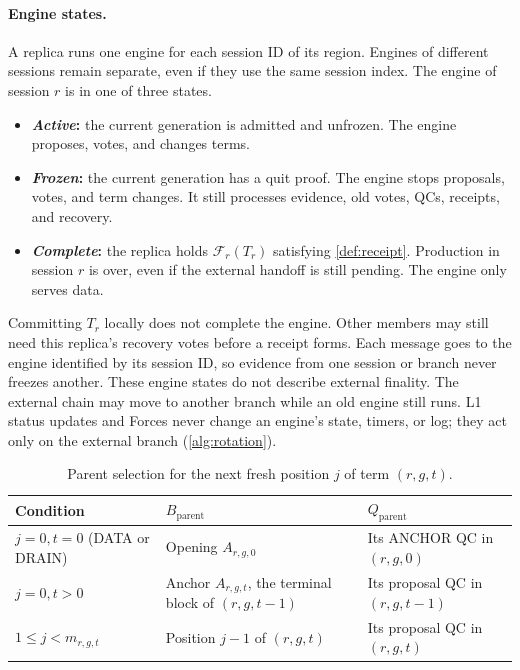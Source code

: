 \documentclass[11pt,a4paper]{article}
\newcommand{\FC}{\mathcal F}
\newcommand{\defterm}[1]{\textcolor{rrBlue}{\textit{#1}}}
\begin{document}
\paragraph{Engine states.}
A replica runs one engine for each session ID of its region.
Engines of different sessions remain separate, even if they use the
same session index. The engine of
session $r$ is in one of three states.
\begin{itemize}
\item \textbf{\defterm{Active}:} the current generation is admitted and unfrozen.
The engine proposes, votes, and changes terms.
\item \textbf{\defterm{Frozen}:} the current generation has a quit proof. The
engine stops proposals, votes, and term changes. It still processes
evidence, old votes, QCs, receipts, and recovery.
\item \textbf{\defterm{Complete}:} the replica holds $\FC_r(T_r)$ satisfying
\cref{def:receipt}.
Production in session $r$ is over, even if the external handoff is still
pending. The engine only serves data.
\end{itemize}
Committing $T_r$ locally does not complete the engine. Other members may
still need this replica's recovery votes before a receipt forms. Each
message goes to the engine identified by its session ID, so
evidence from one session or branch never freezes another. These engine
states do not describe external finality. The external chain may move
to another branch while an old engine still runs. L1 status
updates and Forces never change an engine's state, timers, or log; they
act only on the external branch (\cref{alg:rotation}).

\begin{table}[htbp]\centering\small
\caption{Parent selection for the next fresh position $j$ of term $(r,g,t)$.}
\label{tab:parent}
\begin{tabularx}{\linewidth}{@{}l Y Y@{}}
\toprule
Condition & $B_{\mathrm{parent}}$ & $Q_{\mathrm{parent}}$\\
\midrule
$j=0,t=0$ (DATA or DRAIN) & Opening $A_{r,g,0}$ & Its ANCHOR QC in $(r,g,0)$\\
$j=0,t>0$ & Anchor $A_{r,g,t}$, the terminal block of $(r,g,t-1)$ & Its proposal QC in $(r,g,t-1)$\\
$1\le j<m_{r,g,t}$ & Position $j-1$ of $(r,g,t)$ & Its proposal QC in $(r,g,t)$\\
\bottomrule
\end{tabularx}
\end{table}
\end{document}
